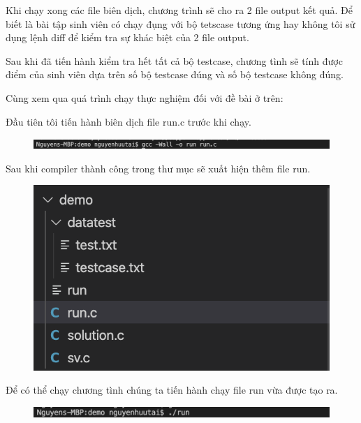 \documentclass[12pt,a4paper]{article}
\begin{document}
Khi chạy xong các file biên dịch, chương trình sẽ cho ra 2 file output kết quả. Để biết là bài tập sinh viên có chạy đụng với bộ tetscase tương ứng hay không tôi sử dụng lệnh diff để kiểm tra sự khác biệt của 2 file output.

Sau khi đã tiến hành kiểm tra hết tất cả bộ testcase, chương tình sẽ tính  được điểm của sinh viên dựa trên số bộ testcase đúng và số bộ testcase không đúng.

Cùng xem qua quá trình chạy thực nghiệm đối với đề bài ở trên:

Đầu tiên tôi tiến hành biên dịch file run.c trước khi chạy.

\begin{figure}[ht]
\begin{center}
\includegraphics[scale=.3]{hinhanh/compilerdemo.png}
\end{center}
\end{figure}

Sau khi compiler thành công trong thư mục sẽ xuất hiện thêm file run.

\begin{figure}[ht]
\begin{center}
\includegraphics[scale=.3]{hinhanh/cautrucsaucompiler.png}
\end{center}
\end{figure}

Để có thể chạy chương tình chúng ta tiến hành chạy file run vừa được tạo ra.

\begin{figure}[ht]
\begin{center}
\includegraphics[scale=.3]{hinhanh/rundemo.png}
\end{center}
\end{figure}
\end{document}
